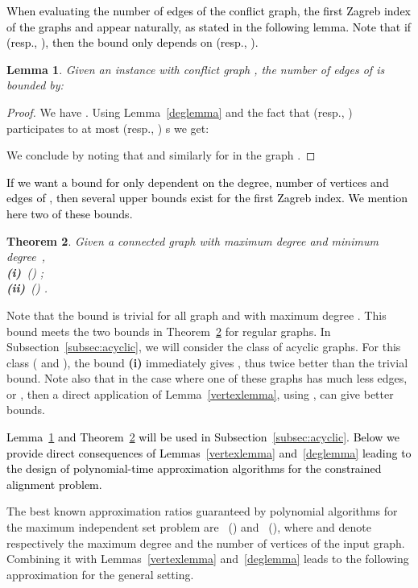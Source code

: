 \documentclass[final]{dmtcs-episciences}
\newtheorem{theorem}{Theorem}
\newtheorem{lemma}[theorem]{Lemma}
\newcommand\mar[1]{\textcolor{black}{#1}}
\begin{document}
\mar{When evaluating the number of edges of the conflict graph, the first Zagreb index of the graphs  and  appear naturally, as stated in the following lemma. Note that if  (resp., ), then the bound only depends on  (resp., ).} 


\begin{lemma}
\label{edgelemma}
Given an instance  with conflict graph , the number  of edges of  is bounded by: 

\end{lemma}
\begin{proof}
We have .
Using Lemma~\ref{deglemma} and the fact that  (resp., ) participates to at most  (resp., ) s we get:

We conclude by noting that    and similarly for  in the graph . \end{proof}

\mar{If we want a bound for  only dependent on the degree, number of vertices and edges of , then  several upper bounds exist for the first Zagreb index.  We mention here two of these bounds.}

\begin{theorem}\label{th:zagreb-bound} Given a connected graph  with maximum degree  and minimum degree~,\\
\textbf{ (i)}~(\citet{Zagreb-Liu}) ;\\
\textbf{ (ii)}~(\citet{Zagreb-Tabar})
.
\end{theorem}


Note that the bound  is trivial for all graph  and with maximum degree . This bound meets the two bounds in Theorem~\ref{th:zagreb-bound} for regular graphs. In Subsection~\ref{subsec:acyclic}, we will consider the class of acyclic graphs. For this class ( and ), the bound \textbf{ (i)} immediately gives , thus twice better than the trivial bound. Note also that in the case where one of these graphs has much less edges,   or , then a direct application of Lemma~\ref{vertexlemma}, using  , can give better bounds. 

\mar{Lemma~\ref{edgelemma}  and Theorem~\ref{th:zagreb-bound} will be used in Subsection~\ref{subsec:acyclic}. Below we provide direct consequences of Lemmas~\ref{vertexlemma} and~\ref{deglemma} leading to the design of polynomial-time approximation algorithms for the constrained alignment problem.}





The best known approximation ratios guaranteed by polynomial algorithms   for the maximum independent set problem are  ~(\citet{approx-stable}) and ~(\citet{Boppana92}), where  and  denote respectively the maximum degree and the number of vertices of the input graph. 
Combining it with
Lemmas~\ref{vertexlemma} and~\ref{deglemma}   leads to the following approximation for the general setting.
\end{document}
